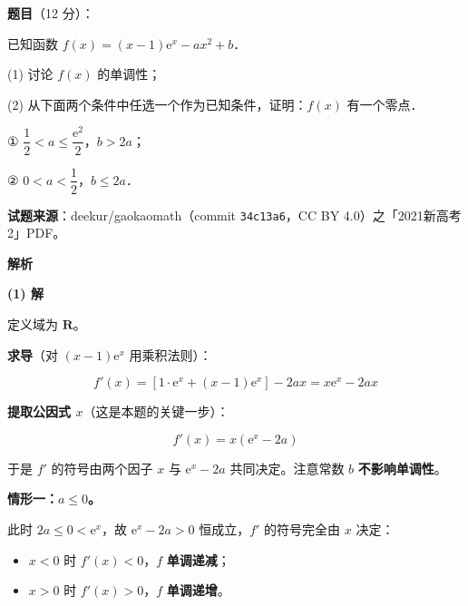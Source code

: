 \begin{answer}



\par\medskip

\end{answer}
\begin{answer}

\textbf{题目}（12 分）：

已知函数 $f(x)=(x-1)\mathrm e^{x}-ax^{2}+b$．

  (1) 讨论 $f(x)$ 的单调性；

  (2) 从下面两个条件中任选一个作为已知条件，证明：$f(x)$ 有一个零点．

  ① $\dfrac12<a\le\dfrac{\mathrm e^{2}}2$，$b>2a$；

  ② $0<a<\dfrac12$，$b\le2a$．

\par\medskip

\begin{gktip}
\textbf{试题来源}：deekur/gaokaomath（commit \texttt{34c13a6}，CC BY 4.0）之「2021新高考2」PDF。
\end{gktip}

\textbf{解析}

\par\medskip

\textbf{(1) 解}

定义域为 $\mathbf R$。

\textbf{求导}（对 $(x-1)\mathrm e^{x}$ 用乘积法则）：

\nopagebreak[4]
\[f'(x)=\left[1\cdot\mathrm e^{x}+(x-1)\mathrm e^{x}\right]-2ax=x\mathrm e^{x}-2ax\]

\textbf{提取公因式 $x$}（这是本题的关键一步）：

\nopagebreak[4]
\[\boxed{\ f'(x)=x\left(\mathrm e^{x}-2a\right)\ }\]

于是 $f'$ 的符号由两个因子 $x$ 与 $\mathrm e^{x}-2a$ 共同决定。注意常数 $b$ \textbf{不影响单调性}。

\par\medskip

\textbf{情形一：$a\le0$。}

此时 $2a\le0<\mathrm e^{x}$，故 $\mathrm e^{x}-2a>0$ 恒成立，$f'$ 的符号完全由 $x$ 决定：

\begin{itemize}
\item $x<0$ 时 $f'(x)<0$，$f$ \textbf{单调递减}；
\item $x>0$ 时 $f'(x)>0$，$f$ \textbf{单调递增}。
\end{itemize}


\end{answer}
